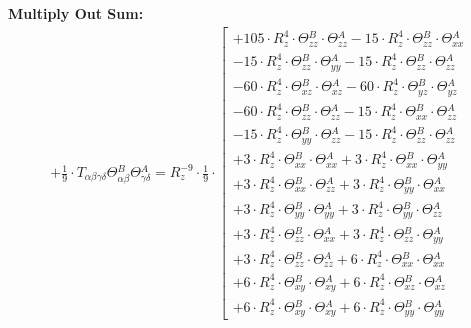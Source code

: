 \documentclass{article}
\begin{document}
\textbf{Multiply Out Sum:}
\begin{subequations}\begin{gather}
+ \frac{1}{9} \cdot T_{\alpha{}\beta{}\gamma{}\delta{}} \Theta{}^{B}_{\alpha{}\beta{}} \Theta{}^{A}_{\gamma{}\delta{}} = R_{z}^{-9} \cdot \frac{1}{9} \cdot  \left[ \begin{array}{c} 
 		+ 105 \cdot R_{z}^{4} \cdot \Theta{}^{B}_{zz} \cdot \Theta{}^{A}_{zz}- 15 \cdot R_{z}^{4} \cdot \Theta{}^{B}_{zz} \cdot \Theta{}^{A}_{xx} 
 \\[0.2em] 		 - 15 \cdot R_{z}^{4} \cdot \Theta{}^{B}_{zz} \cdot \Theta{}^{A}_{yy}- 15 \cdot R_{z}^{4} \cdot \Theta{}^{B}_{zz} \cdot \Theta{}^{A}_{zz} 
 \\[0.2em] 		 - 60 \cdot R_{z}^{4} \cdot \Theta{}^{B}_{xz} \cdot \Theta{}^{A}_{xz}- 60 \cdot R_{z}^{4} \cdot \Theta{}^{B}_{yz} \cdot \Theta{}^{A}_{yz} 
 \\[0.2em] 		 - 60 \cdot R_{z}^{4} \cdot \Theta{}^{B}_{zz} \cdot \Theta{}^{A}_{zz}- 15 \cdot R_{z}^{4} \cdot \Theta{}^{B}_{xx} \cdot \Theta{}^{A}_{zz} 
 \\[0.2em] 		 - 15 \cdot R_{z}^{4} \cdot \Theta{}^{B}_{yy} \cdot \Theta{}^{A}_{zz}- 15 \cdot R_{z}^{4} \cdot \Theta{}^{B}_{zz} \cdot \Theta{}^{A}_{zz} 
 \\[0.2em] 		 + 3 \cdot R_{z}^{4} \cdot \Theta{}^{B}_{xx} \cdot \Theta{}^{A}_{xx}+ 3 \cdot R_{z}^{4} \cdot \Theta{}^{B}_{xx} \cdot \Theta{}^{A}_{yy} 
 \\[0.2em] 		 + 3 \cdot R_{z}^{4} \cdot \Theta{}^{B}_{xx} \cdot \Theta{}^{A}_{zz}+ 3 \cdot R_{z}^{4} \cdot \Theta{}^{B}_{yy} \cdot \Theta{}^{A}_{xx} 
 \\[0.2em] 		 + 3 \cdot R_{z}^{4} \cdot \Theta{}^{B}_{yy} \cdot \Theta{}^{A}_{yy}+ 3 \cdot R_{z}^{4} \cdot \Theta{}^{B}_{yy} \cdot \Theta{}^{A}_{zz} 
 \\[0.2em] 		 + 3 \cdot R_{z}^{4} \cdot \Theta{}^{B}_{zz} \cdot \Theta{}^{A}_{xx}+ 3 \cdot R_{z}^{4} \cdot \Theta{}^{B}_{zz} \cdot \Theta{}^{A}_{yy} 
 \\[0.2em] 		 + 3 \cdot R_{z}^{4} \cdot \Theta{}^{B}_{zz} \cdot \Theta{}^{A}_{zz}+ 6 \cdot R_{z}^{4} \cdot \Theta{}^{B}_{xx} \cdot \Theta{}^{A}_{xx} 
 \\[0.2em] 		 + 6 \cdot R_{z}^{4} \cdot \Theta{}^{B}_{xy} \cdot \Theta{}^{A}_{xy}+ 6 \cdot R_{z}^{4} \cdot \Theta{}^{B}_{xz} \cdot \Theta{}^{A}_{xz} 
 \\[0.2em] 		 + 6 \cdot R_{z}^{4} \cdot \Theta{}^{B}_{xy} \cdot \Theta{}^{A}_{xy}+ 6 \cdot R_{z}^{4} \cdot \Theta{}^{B}_{yy} \cdot \Theta{}^{A}_{yy} 

\end{array}
\end{gather}
\end{subequations}
\end{document}
